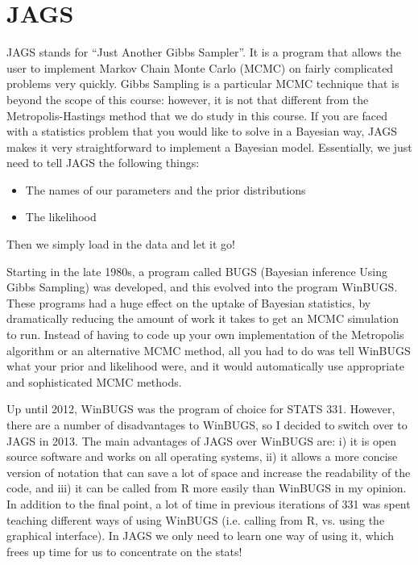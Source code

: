 \chapter{JAGS}
JAGS stands for ``Just Another Gibbs Sampler''. It is a program that allows the user
to implement Markov Chain Monte Carlo (MCMC) on fairly complicated problems
very quickly. Gibbs Sampling is a particular MCMC technique that is beyond the
scope of this course: however, it is not that different from the Metropolis-Hastings
method that we do study in this course. If you are faced with a statistics
problem that you would like to solve in a Bayesian way, JAGS makes it very
straightforward to implement a Bayesian model. Essentially, we just need to tell
JAGS the following things:
\begin{itemize}
\item The names of our parameters and the prior distributions
\item The likelihood
\end{itemize}
Then we simply load in the data and let it go!

Starting in the late 1980s, a program called BUGS (Bayesian inference Using
Gibbs Sampling) was developed, and this evolved into the program WinBUGS. These
programs had a huge effect on the uptake of Bayesian statistics, by dramatically
reducing the amount of work it takes to get an MCMC simulation to run. Instead
of having to code up your own implementation of the Metropolis algorithm or
an alternative MCMC method, all you had to do was tell WinBUGS what your prior
and likelihood were, and it would automatically use appropriate and sophisticated
MCMC methods.

Up until 2012, WinBUGS was the
program of choice for STATS 331. However, there are a number of disadvantages to
WinBUGS, so I decided to switch over to JAGS in 2013. The main advantages of
JAGS over WinBUGS are: i) it is open source software and works on all
operating systems, ii) it allows a more concise version of notation that can
save a lot of space and increase the readability of the code, and iii) it can
be called from R more easily than WinBUGS in my opinion. In addition to the
final point, a lot of time in previous iterations of 331 was spent teaching
different ways of using WinBUGS (i.e. calling from R, vs. using the graphical
interface). In JAGS we only need to learn one way of using
it, which frees up time for us to concentrate on the stats!

